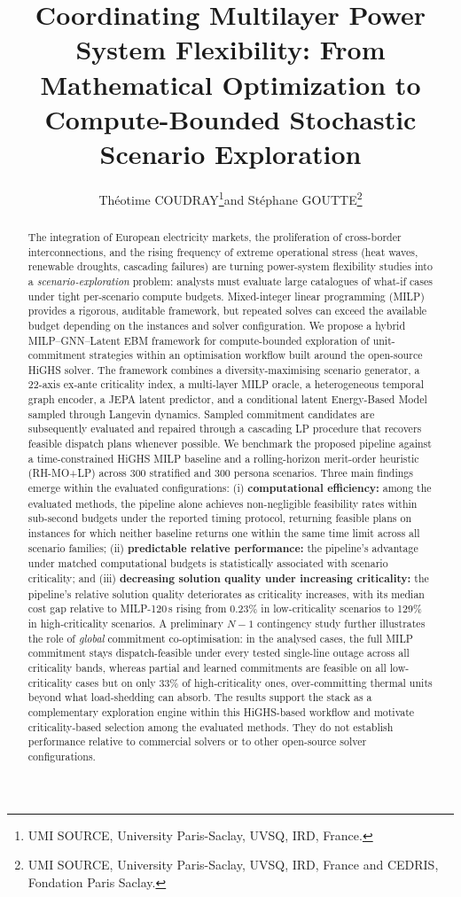 \documentclass{article}
\title{Coordinating Multilayer Power System Flexibility:
From Mathematical Optimization to Compute-Bounded Stochastic Scenario Exploration}
\author{
Théotime COUDRAY\thanks{UMI SOURCE, University Paris-Saclay, UVSQ, IRD, France.}\quad and St\'ephane GOUTTE\thanks{UMI SOURCE, University Paris-Saclay, UVSQ, IRD, France and CEDRIS, Fondation Paris Saclay.}
}
\date{}
\begin{document}
\maketitle

\begin{abstract}
The integration of European electricity markets, the proliferation of cross-border interconnections, and the rising frequency of extreme operational stress (heat waves, renewable droughts, cascading failures) are turning power-system flexibility studies into a \emph{scenario-exploration} problem: analysts must evaluate large catalogues of what-if cases under tight per-scenario compute budgets. Mixed-integer linear programming (MILP) provides a rigorous, auditable framework, but repeated solves can exceed the available budget depending on the instances and solver configuration. We propose a hybrid MILP--GNN--Latent EBM framework for compute-bounded exploration of unit-commitment strategies within an optimisation workflow built around the open-source HiGHS solver. The framework combines a diversity-maximising scenario generator, a 22-axis ex-ante criticality index, a multi-layer MILP oracle, a heterogeneous temporal graph encoder, a JEPA latent predictor, and a conditional latent Energy-Based Model sampled through Langevin dynamics. Sampled commitment candidates are subsequently evaluated and repaired through a cascading LP procedure that recovers feasible dispatch plans whenever possible. We benchmark the proposed pipeline against a time-constrained HiGHS MILP baseline and a rolling-horizon merit-order heuristic (RH-MO+LP) across 300 stratified and 300 persona scenarios. Three main findings emerge within the evaluated configurations: (i) \textbf{computational efficiency:} among the evaluated methods, the pipeline alone achieves non-negligible feasibility rates within sub-second budgets under the reported timing protocol, returning feasible plans on instances for which neither baseline returns one within the same time limit across all scenario families; (ii) \textbf{predictable relative performance:} the pipeline's advantage under matched computational budgets is statistically associated with scenario criticality; and (iii) \textbf{decreasing solution quality under increasing criticality:} the pipeline's relative solution quality deteriorates as criticality increases, with its median cost gap relative to MILP-120\,s rising from 0.23\% in low-criticality scenarios to 129\% in high-criticality scenarios. A preliminary $N{-}1$ contingency study further illustrates the role of \emph{global} commitment co-optimisation: in the analysed cases, the full MILP commitment stays dispatch-feasible under every tested single-line outage across all criticality bands, whereas partial and learned commitments are feasible on all low-criticality cases but on only $33\%$ of high-criticality ones, over-committing thermal units beyond what load-shedding can absorb. The results support the stack as a complementary exploration engine within this HiGHS-based workflow and motivate criticality-based selection among the evaluated methods. They do not establish performance relative to commercial solvers or to other open-source solver configurations.
\end{abstract}
\end{document}
